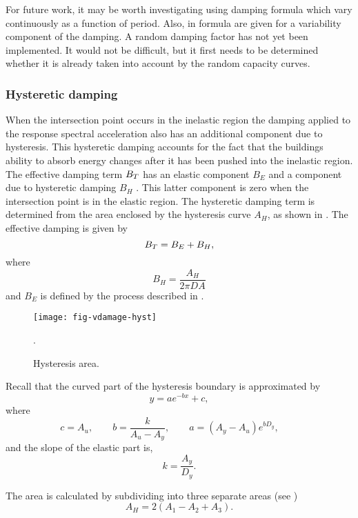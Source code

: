 For future work, it may be worth investigating using damping
formula which vary continuously as a function of period. Also, in
\cite{Newmark82} formula are given for a variability component of
the damping. A random damping factor has not yet been implemented.
It would not be difficult, but it first needs to be determined
whether it is already taken into account by the random capacity
curves.



\subsubsection{Hysteretic damping}
\label{sec:dam-hystericdamping}

When the intersection point occurs in the inelastic region the
damping applied to the response spectral
acceleration also has an
additional component due to hysteresis. This hysteretic damping
accounts for the fact that the buildings ability to absorb energy
changes after it has been pushed into the inelastic region. The
effective damping term $\Beff$ has an
elastic component $B_E$ and a component due to hysteretic damping
$B_H$ . This latter component is zero when the intersection point
is in the elastic region. The hysteretic damping term is
determined from the area enclosed by the hysteresis curve $A_H$,
as shown in . The effective
damping is given by
\begin{equation}
\Beff = B_E + B_H,
\end{equation}
where
\begin{equation}
B_H = \frac{A_H}{2\pi DA}
\end{equation}
and $B_E$ is defined by the process described in
.
\begin{figure}
\centering
{}
\texttt{[image: fig-vdamage-hyst]}
\caption{Hysteresis area.}
\label{fig:vdamage-hystarea}.
\end{figure}

Recall that the curved part of the hysteresis boundary is
approximated by
$$
 y = ae^{-bx}+c,
$$
where
$$
 c = A_u, \qquad
 b = \frac{k}{A_u-A_y}, \qquad
 a = (A_y-A_u)e^{b D_y}, \qquad
$$
and the slope of the elastic part is,
$$
 k = \frac{A_y}{D_y}.
$$

The area is calculated by subdividing into three separate areas
(see )
$$
 A_H = 2(A_1-A_2+A_3).
$$

